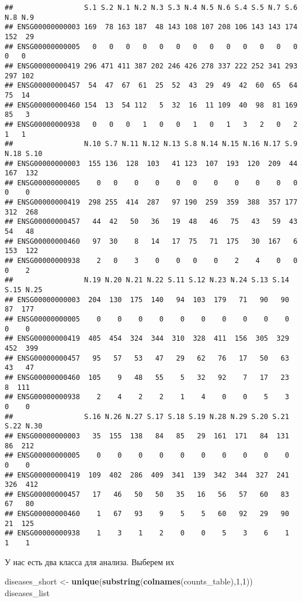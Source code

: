 \documentclass[
]{article}
\newenvironment{Shaded}{\begin{snugshade}}{\end{snugshade}}
\newcommand{\DecValTok}[1]{\textcolor[rgb]{0.00,0.00,0.81}{#1}}
\newcommand{\KeywordTok}[1]{\textcolor[rgb]{0.13,0.29,0.53}{\textbf{#1}}}
\newcommand{\NormalTok}[1]{#1}
\newcommand{\StringTok}[1]{\textcolor[rgb]{0.31,0.60,0.02}{#1}}
\begin{document}
\begin{verbatim}
##                 S.1 S.2 N.1 N.2 N.3 S.3 N.4 N.5 N.6 S.4 S.5 N.7 S.6 N.8 N.9
## ENSG00000000003 169  78 163 187  48 143 108 107 208 106 143 143 174 152  29
## ENSG00000000005   0   0   0   0   0   0   0   0   0   0   0   0   0   0   0
## ENSG00000000419 296 471 411 387 202 246 426 278 337 222 252 341 293 297 102
## ENSG00000000457  54  47  67  61  25  52  43  29  49  42  60  65  64  75  14
## ENSG00000000460 154  13  54 112   5  32  16  11 109  40  98  81 169  85   3
## ENSG00000000938   0   0   0   1   0   0   1   0   1   3   2   0   2   1   1
##                 N.10 S.7 N.11 N.12 N.13 S.8 N.14 N.15 N.16 N.17 S.9 N.18 S.10
## ENSG00000000003  155 136  128  103   41 123  107  193  120  209  44  167  132
## ENSG00000000005    0   0    0    0    0   0    0    0    0    0   0    0    0
## ENSG00000000419  298 255  414  287   97 190  259  359  388  357 177  312  268
## ENSG00000000457   44  42   50   36   19  48   46   75   43   59  43   54   48
## ENSG00000000460   97  30    8   14   17  75   71  175   30  167   6  153  122
## ENSG00000000938    2   0    3    0    0   0    0    2    4    0   0    0    2
##                 N.19 N.20 N.21 N.22 S.11 S.12 N.23 N.24 S.13 S.14 S.15 N.25
## ENSG00000000003  204  130  175  140   94  103  179   71   90   90   87  177
## ENSG00000000005    0    0    0    0    0    0    0    0    0    0    0    0
## ENSG00000000419  405  454  324  344  310  328  411  156  305  329  452  399
## ENSG00000000457   95   57   53   47   29   62   76   17   50   63   43   47
## ENSG00000000460  105    9   48   55    5   32   92    7   17   23    8  111
## ENSG00000000938    2    4    2    2    1    4    0    0    5    3    0    0
##                 S.16 N.26 N.27 S.17 S.18 S.19 N.28 N.29 S.20 S.21 S.22 N.30
## ENSG00000000003   35  155  138   84   85   29  161  171   84  131   86  212
## ENSG00000000005    0    0    0    0    0    0    0    0    0    0    0    0
## ENSG00000000419  109  402  286  409  341  139  342  344  327  241  326  412
## ENSG00000000457   17   46   50   50   35   16   56   57   60   83   67   80
## ENSG00000000460    1   67   93    9    5    5   60   92   29   90   21  125
## ENSG00000000938    1    3    1    2    0    0    5    3    6    1    1    1
\end{verbatim}

У нас есть два класса для анализа. Выберем их

\begin{Shaded}
\begin{Highlighting}[]
\NormalTok{diseases_short <-}\StringTok{ }\KeywordTok{unique}\NormalTok{(}\KeywordTok{substring}\NormalTok{(}\KeywordTok{colnames}\NormalTok{(counts_table),}\DecValTok{1}\NormalTok{,}\DecValTok{1}\NormalTok{))}
\NormalTok{diseases_list}
\end{Highlighting}
\end{Shaded}
\end{document}

